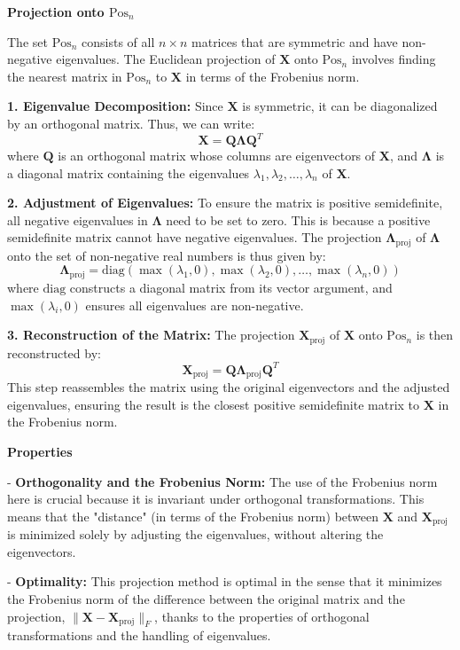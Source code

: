 \documentclass[8pt]{article}
\begin{document}
{\textbf{Projection onto \(\mathrm{Pos}_n\)}

The set \(\mathrm{Pos}_n\) consists of all \(n \times n\) matrices that are symmetric and have non-negative eigenvalues. The Euclidean projection of \(\mathbf{X}\) onto \(\mathrm{Pos}_n\) involves finding the nearest matrix in \(\mathrm{Pos}_n\) to \(\mathbf{X}\) in terms of the Frobenius norm.

\textbf{1. Eigenvalue Decomposition:}
   Since \(\mathbf{X}\) is symmetric, it can be diagonalized by an orthogonal matrix. Thus, we can write:
   \[
   \mathbf{X} = \mathbf{Q} \mathbf{\Lambda} \mathbf{Q}^T
   \]
   where \(\mathbf{Q}\) is an orthogonal matrix whose columns are eigenvectors of \(\mathbf{X}\), and \(\mathbf{\Lambda}\) is a diagonal matrix containing the eigenvalues \(\lambda_1, \lambda_2, \dots, \lambda_n\) of \(\mathbf{X}\).

\textbf{2. Adjustment of Eigenvalues:}
   To ensure the matrix is positive semidefinite, all negative eigenvalues in \(\mathbf{\Lambda}\) need to be set to zero. This is because a positive semidefinite matrix cannot have negative eigenvalues. The projection \(\mathbf{\Lambda}_{\text{proj}}\) of \(\mathbf{\Lambda}\) onto the set of non-negative real numbers is thus given by:
   \[
   \mathbf{\Lambda}_{\text{proj}} = \mathrm{diag}(\max(\lambda_1, 0), \max(\lambda_2, 0), \dots, \max(\lambda_n, 0))
   \]
   where \(\mathrm{diag}\) constructs a diagonal matrix from its vector argument, and \(\max(\lambda_i, 0)\) ensures all eigenvalues are non-negative.

\textbf{3. Reconstruction of the Matrix:}
   The projection \(\mathbf{X}_{\text{proj}}\) of \(\mathbf{X}\) onto \(\mathrm{Pos}_n\) is then reconstructed by:
   \[
   \mathbf{X}_{\text{proj}} = \mathbf{Q} \mathbf{\Lambda}_{\text{proj}} \mathbf{Q}^T
   \]
   This step reassembles the matrix using the original eigenvectors and the adjusted eigenvalues, ensuring the result is the closest positive semidefinite matrix to \(\mathbf{X}\) in the Frobenius norm.

\textbf{Properties}

- \textbf{Orthogonality and the Frobenius Norm:}
   The use of the Frobenius norm here is crucial because it is invariant under orthogonal transformations. This means that the "distance" (in terms of the Frobenius norm) between \(\mathbf{X}\) and \(\mathbf{X}_{\text{proj}}\) is minimized solely by adjusting the eigenvalues, without altering the eigenvectors.
  
- \textbf{Optimality:}
   This projection method is optimal in the sense that it minimizes the Frobenius norm of the difference between the original matrix and the projection, \(\|\mathbf{X} - \mathbf{X}_{\text{proj}}\|_F\), thanks to the properties of orthogonal transformations and the handling of eigenvalues.

}
\end{document}
